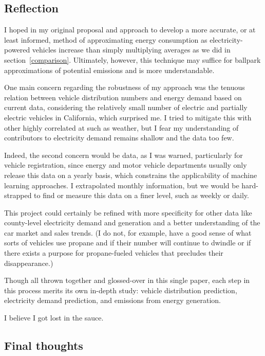 \documentclass{article}
\begin{document}
\subsection{Reflection}

I hoped in my original proposal and approach to develop a more accurate, or at least informed, method of approximating energy consumption as electricity-powered vehicles increase than simply multiplying averages as we did in section~\ref{comparison}. Ultimately, however, this technique may suffice for ballpark approximations of potential emissions and is more understandable.

One main concern regarding the robustness of my approach was the tenuous relation between vehicle distribution numbers and energy demand based on current data, considering the relatively small number of electric and partially electric vehicles in California, which surprised me. I tried to mitigate this with other highly correlated at such as weather, but I fear my understanding of contributors to electricity demand remains shallow and the data too few.

Indeed, the second concern would be data, as I was warned, particularly for vehicle registration, since energy and motor vehicle departments usually only release this data on a yearly basis, which constrains the applicability of machine learning approaches. I extrapolated monthly information, but we would be hard-strapped to find or measure this data on a finer level, such as weekly or daily.

This project could certainly be refined with more specificity for other data like county-level electricity demand and generation and a better understanding of the car market and sales trends. (I do not, for example, have a good sense of what sorts of vehicles use propane and if their number will continue to dwindle or if there exists a purpose for propane-fueled vehicles that precludes their disappearance.) 

Though all thrown together and glossed-over in this single paper, each step in this process merits its own in-depth study: vehicle distribution prediction, electricity demand prediction, and emissions from energy generation.

I believe I got lost in the sauce.

\subsection{Final thoughts}
\end{document}
